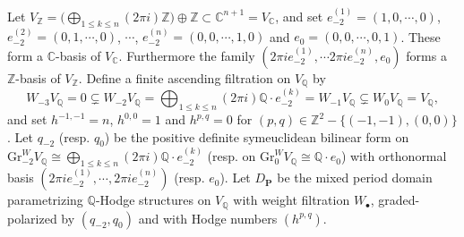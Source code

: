 \documentclass[10pt]{article}
\numberwithin{equation}{subsection}
\theoremstyle{plain}
\theoremstyle{definition}
\theoremstyle{remark}
\newcommand{\Z}{\mathbb Z}
\newcommand{\Q}{\mathbb Q}
\newcommand{\C}{\mathbb C}
\newcommand{\pp}{\mathbf P}
\newcommand{\bul}{\bullet}
\newcommand{\Gr}{\mathrm{Gr}}
\newcommand{\ee}{e_{-2}}
\begin{document}
Let $V_\Z = \Big( \bigoplus_{1 \leqslant k \leqslant n} (2\pi i) \Z \Big)  \oplus \Z \subset \C^{n+1} = V_\C$, and set $\ee^{(1)} = (1,0,\cdots,0)$, $\ee^{(2)} = (0,1,\cdots,0)$, $\cdots$, $\ee^{(n)} = (0,0, \cdots, 1, 0)$ and $e_0 = (0,0,\cdots, 0,1)$. These form a $\C$-basis of $V_\C$. Furthermore the family $(2\pi i \ee^{(1)}, \cdots  2\pi i \ee^{(n)}, e_0)$ forms a $\Z$-basis of $V_\Z$. Define a finite ascending filtration on $V_\Q$ by
\[
W_{-3} V_\Q = 0 \subsetneq W_{-2}V_\Q = \bigoplus_{1 \leqslant k \leqslant n} (2 \pi i) \Q \cdot \ee^{(k)} = W_{-1}V_\Q \subsetneq W_0V_\Q = V_\Q,
\]
and set $h^{-1,-1} = n$, $h^{0,0} = 1$ and $h^{p,q} = 0$ for $(p,q) \in \Z^2-\{(-1,-1), (0,0)\}$. Let $q_{-2}$ (resp. $q_0$) be the positive definite symeuclidean bilinear form on $\Gr^W_{-2} V_\Q \cong \bigoplus_{1 \leqslant k \leqslant n} (2 \pi i) \Q \cdot \ee^{(k)}$ (resp. on $\Gr^W_0 V_\Q \cong \Q \cdot e_0$) with orthonormal basis $(2\pi i \ee^{(1)}, \cdots ,2 \pi i \ee^{(n)})$ (resp. $e_0$). Let $D_\pp$ be the mixed period domain parametrizing $\Q$-Hodge structures on $V_\Q$ with weight filtration $W_\bul$, graded-polarized by $(q_{-2}, q_0)$ and with Hodge numbers $(h^{p,q})$.
\end{document}
